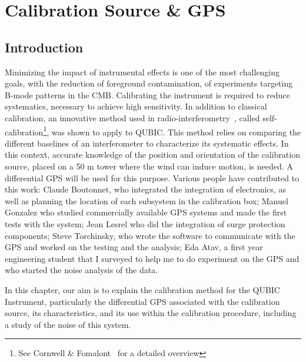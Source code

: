 \documentclass[../../thesis.tex]{subfiles}
\begin{document}
\ifSubfilesClassLoaded{
    \tableofcontents
}{}

\chapter{Calibration Source \& GPS} \label{chap:gps}
\minitoc
{}

\section{Introduction}

Minimizing the impact of instrumental effects is one of the most challenging goals, with the reduction of foreground contamination, of experiments targeting B-mode patterns in the CMB. Calibrating the instrument is required to reduce systematics, necessary to achieve high sensitivity. In addition to classical calibration, an innovative method used in radio-interferometry~\cite{paper_selfcal_1,paper_selfcal_2}, called self-calibration\footnote{See Cornwell \& Fomalont~\cite{selfcal_overview} for a detailed overview}, was shown to apply to QUBIC. This method relies on comparing the different baselines of an interferometer to characterize its systematic effects. In this context, accurate knowledge of the position and orientation of the calibration source, placed on a 50 m tower where the wind can induce motion, is needed. A differential GPS will be used for this purpose. Various people have contributed to this work: Claude Boutonnet, who integrated the integration of electronics, as well as planning the location of each subsystem in the calibration box; Manuel Gonzalez who studied commercially available GPS systems and made the first tests with the system; Jean Lesrel who did the integration of surge protection components; Steve Torchinsky, who wrote the software to communicate with the GPS and worked on the testing and the analysis; Eda Atav, a first year engineering student that I surveyed to help me to do experiment on the GPS and who started the noise analysis of the data.

In this chapter, our aim is to explain the calibration method for the QUBIC Instrument, particularly the differential GPS associated with the calibration source, its characteristics, and its use within the calibration procedure, including a study of the noise of this system. 

\end{document}
